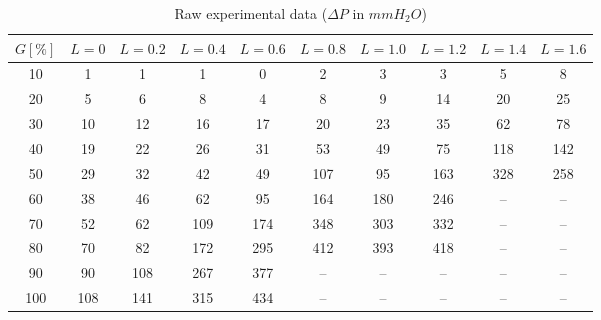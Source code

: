 \begin{table}[H]
    \centering
    \caption{Raw experimental data ($\Delta P$ in $mmH_2O$)}
    \begin{tabular}{c|ccccccccc}
        \hline
        $G [\%]$ & $L=0$ & $L=0.2$ & $L=0.4$ & $L=0.6$ & $L=0.8$ & $L=1.0$ & $L=1.2$ & $L=1.4$ & $L=1.6$ \\
        \hline
        10 & 1 & 1 & 1 & 0 & 2 & 3 & 3 & 5 & 8 \\
        20 & 5 & 6 & 8 & 4 & 8 & 9 & 14 & 20 & 25 \\
        30 & 10 & 12 & 16 & 17 & 20 & 23 & 35 & 62 & 78 \\
        40 & 19 & 22 & 26 & 31 & 53 & 49 & 75 & 118 & 142 \\
        50 & 29 & 32 & 42 & 49 & 107 & 95 & 163 & 328 & 258 \\
        60 & 38 & 46 & 62 & 95 & 164 & 180 & 246 & -- & -- \\
        70 & 52 & 62 & 109 & 174 & 348 & 303 & 332 & -- & -- \\
        80 & 70 & 82 & 172 & 295 & 412 & 393 & 418 & -- & -- \\
        90 & 90 & 108 & 267 & 377 & -- & -- & -- & -- & -- \\
        100 & 108 & 141 & 315 & 434 & -- & -- & -- & -- & -- \\
        \hline
    \end{tabular}
\end{table}
